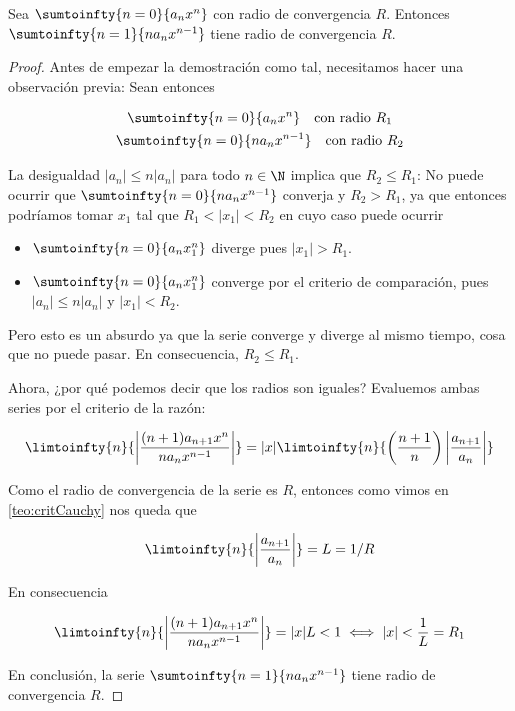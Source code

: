 \begin{teo}
    Sea $\sumtoinfty{n=0}{a_nx^n}$ con radio de convergencia $R$. Entonces $\sumtoinfty{n=1}{na_nx^{n-1}}$ tiene radio de convergencia $R$.
\end{teo}

\begin{proof}
    Antes de empezar la demostración como tal, necesitamos hacer una observación previa: Sean entonces
    
    \begin{gather*}
        \sumtoinfty{n=0}{a_nx^n} \quad \text{con radio $R_1$} \\
        \sumtoinfty{n=0}{na_nx^{n-1}} \quad \text{con radio $R_2$}
    \end{gather*}
    
    La desigualdad $|a_n| \leq n|a_n|$ para todo $n \in \N$ implica que $R_2 \leq R_1$: No puede ocurrir que $\sumtoinfty{n=0}{na_nx^{n-1}}$ converja y $R_2 > R_1$, ya que entonces podríamos tomar $x_1$ tal que $R_1 < |x_1| < R_2$ en cuyo caso puede ocurrir
    
    \begin{itemize}
        \item $\sumtoinfty{n=0}{a_nx_1^n}$ diverge pues $|x_1|>R_1$.
        \item $\sumtoinfty{n=0}{a_nx_1^n}$ converge por el criterio de comparación, pues $|a_n| \leq n|a_n|$ y $|x_1|<R_2$.
    \end{itemize}
    
    Pero esto es un absurdo ya que la serie converge y diverge al mismo tiempo, cosa que no puede pasar. En consecuencia, $R_2 \leq R_1$.
    
    Ahora, ¿por qué podemos decir que los radios son iguales? Evaluemos ambas series por el criterio de la razón:
    
    \[
    \limtoinfty{n}{\left|\frac{(n+1)a_{n+1}x^n}{na_nx^{n-1}}\right|} = |x|\limtoinfty{n}{\left(\frac{n+1}{n}\right)\left|\frac{a_{n+1}}{a_n}\right|}
    \]
    
    Como el radio de convergencia de la serie es $R$, entonces como vimos en \ref{teo:critCauchy} nos queda que
    
    \[
    \limtoinfty{n}{\left|\frac{a_{n+1}}{a_n}\right|} = L = 1/R
    \]
    
    En consecuencia
    
    \[
    \limtoinfty{n}{\left|\frac{(n+1)a_{n+1}x^n}{na_nx^{n-1}}\right|} = |x|L < 1 \iff |x| < \frac{1}{L} = R_1
    \]
    
    En conclusión, la serie $\sumtoinfty{n=1}{na_nx^{n-1}}$ tiene radio de convergencia $R$.
\end{proof}

